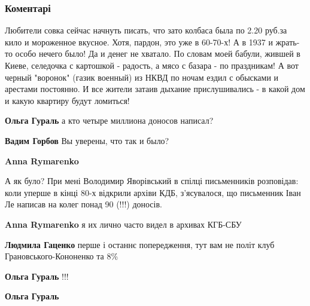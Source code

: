  
 
 
 
 
\subsubsection{Коментарі}
\label{sec:10_11_2021.fb.fb_group.story_kiev_ua.2.konstantin_kievskij_muchenik.cmt}

\begin{itemize} %

Любители совка сейчас начнуть писать, что зато колбаса была по 2.20 руб.за кило
и мороженное вкусное. Хотя, пардон, это уже в 60-70-х! А в 1937 и жрать-то
особо нечего было! Да и денег не хватало. По словам моей бабули, жившей в
Киеве, селедочка с картошкой - радость, а мясо с базара - по праздникам! А вот
черный "воронок" (газик военный) из НКВД по ночам ездил с обысками и арестами
постоянно. И все жители затаив дыхание прислушивались - в какой дом и какую
квартиру будут ломиться!

\begin{itemize} %
\textbf{Ольга Гураль} а кто четыре миллиона доносов написал?

\begin{itemize} %
\textbf{Вадим Горбов} Вы уверены, что так и было?

\textbf{Anna Rymarenko} 

А як було? При мені Володимир Яворівський в спілці письменників розповідав:
коли уперше в кінці 80-х відкрили архіви КДБ, з'ясувалося, що письменник Іван
Ле написав на колег понад 90 (!!!) доносів.

\textbf{Anna Rymarenko} я их лично часто видел в архивах КГБ-СБУ

\textbf{Людмила Гаценко} перше і останнє попередження, тут вам не політ клуб Грановського-Кононенко та 8\%
\end{itemize} %

\textbf{Ольга Гураль} !!!

\textbf{Ольга Гураль} 


\end{itemize}
\end{itemize}
